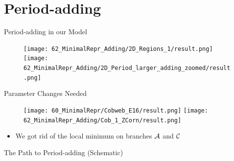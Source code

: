 \section{Period-adding}

\begin{frame}{Period-adding in our Model}
	\begin{figure}
		\texttt{[image: 62\_MinimalRepr\_Adding/2D\_Regions\_1/result.png]}
		\quad
		\texttt{[image: 62\_MinimalRepr\_Adding/2D\_Period\_larger\_adding\_zoomed/result.png]}
	\end{figure}
\end{frame}

\begin{frame}{Parameter Changes Needed}
	\vspace{-1em}
	\begin{figure}
		\texttt{[image: 60\_MinimalRepr/Cobweb\_E16/result.png]}
		\texttt{[image: 62\_MinimalRepr\_Adding/Cob\_1\_ZCorn/result.png]}
	\end{figure}
	\begin{itemize}
		\item We got rid of the local minimum on branches $\mathcal{A}$ and $\mathcal{C}$
	\end{itemize}
\end{frame}

\begin{frame}{The Path to Period-adding (Schematic)}
	\begin{figure}
	\end{figure}
\end{frame}

